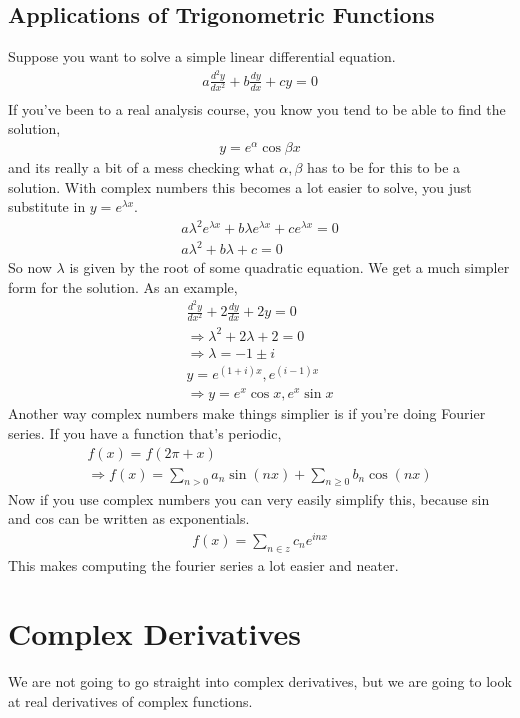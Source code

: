 \documentclass{article}
\begin{document}
\subsection{Applications of Trigonometric Functions}
Suppose you want to solve a simple linear differential equation.
\begin{gather*}
	a \frac{d^2y}{dx^2} + b \frac{dy}{dx} + cy = 0 \\
\end{gather*}
If you've been to a real analysis course, you know you tend to be able to find the solution,
\begin{gather*}
	y = e^\alpha \cos \beta x
\end{gather*}
and its really a bit of a mess checking what $\alpha, \beta$ has to be for this to be a solution.
With complex numbers this becomes a lot easier to solve, you just substitute in $y = e^{\lambda x}$.
\begin{gather*}
	a \lambda^2 e^{\lambda x} + b \lambda e^{\lambda x} + c e^{\lambda x} = 0 \\
	a \lambda^2 + b \lambda + c = 0
\end{gather*}
So now $\lambda$ is given by the root of some quadratic equation. We get a much simpler form for the
solution. As an example,
\begin{gather*}
	\frac{d^2y}{dx^2} + 2 \frac{dy}{dx} + 2y = 0 \\
	\Rightarrow \lambda^2 + 2 \lambda + 2 = 0 \\
	\Rightarrow \lambda = -1 \pm i \\
	y = e^{(1+i)x}, e^{(i-1)x} \\
	\Rightarrow y = e^x \cos x, e^x \sin x
\end{gather*}
Another way complex numbers make things simplier is if you're doing Fourier series. If you have a
function that's periodic,
\begin{gather*}
	f(x) = f(2\pi + x) \\
	\Rightarrow f(x) = \sum_{n > 0}a_n \sin (nx) + \sum_{n \geq 0}b_n \cos (nx)
\end{gather*}
Now if you use complex numbers you can very easily simplify this, because sin and cos can be written
as exponentials.
\begin{gather*}
	f(x) = \sum_{n \in z}c_n e^{inx}
\end{gather*}
This makes computing the fourier series a lot easier and neater.

\section{Complex Derivatives}
We are not going to go straight into complex derivatives, but we are going to look at real derivatives
of complex functions.
\end{document}
